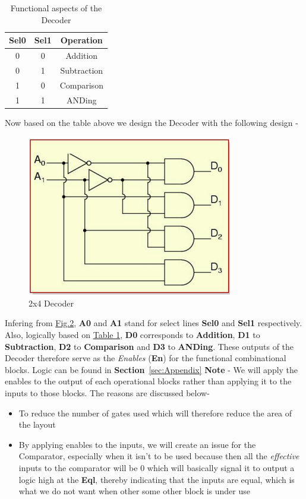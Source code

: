 \documentclass[a4paper, titlepage]{article}
\begin{document}
\begin{table}[h]
\begin{center} 
\hypertarget{dec_tab}{
\begin{tabular}{|c|c|c|}
    \hline 
    \textbf{Sel0} & \textbf{Sel1} & \textbf{Operation} \\
    \hline
    0 & 0 & Addition \\
    \hline 
    0 & 1 & Subtraction \\
    \hline 
    1 & 0 & Comparison \\
    \hline 
    1 & 1 & ANDing \\
    \hline
\end{tabular}}
\caption{Functional aspects of the Decoder}
\label{tab:t1}
\end{center}
\end{table}
Now based on the table above we design the Decoder with the following design - 
\begin{figure}[htp]
    \centering
    \hypertarget{Dec}{\includegraphics[scale = 0.6]{Image_Decoder.png}}
    \caption{2x4 Decoder}
    \label{fig:fig1}
\end{figure}

Infering from \hyperlink{Dec}{Fig.2}, \textbf{A0} and \textbf{A1} stand for select lines \textbf{Sel0}
and \textbf{Sel1} respectively. Also, logically based on \hyperlink{dec_tab}{Table 1}, \textbf{D0} 
corresponds to \textbf{Addition}, \textbf{D1} to \textbf{Subtraction}, \textbf{D2} to \textbf{Comparison} and 
\textbf{D3} to \textbf{ANDing}. These outputs of the Decoder therefore serve as the \textit{Enables} (\textbf{En}) 
for the functional combinational blocks. Logic can be found in \textbf{Section}~\ref{sec:Appendix}\newline 
\textbf{Note} - We will apply the enables to the output of each operational blocks rather than applying it 
to the inputs to those blocks. The reasons are discussed below-
\begin{itemize}
    \item To reduce the number of gates used which will therefore reduce the area of the layout 
    \item By applying enables to the inputs, we will create an issue for the Comparator, especially when it isn't to 
    be used because then all the \textit{effective} inputs to the comparator will be 0 which will basically signal it to 
    output a logic high at the \textbf{Eql}, thereby indicating that the inputs are equal, which is what we do not want 
    when other some other block is under use
\end{itemize}
\end{document}

